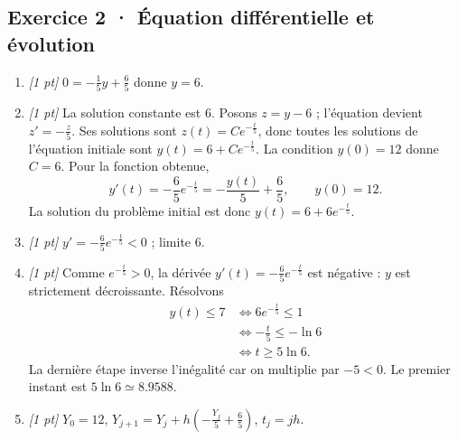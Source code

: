 \subsection*{Exercice 2 · Équation différentielle et évolution}\begin{enumerate}

\item \textit{[1 pt]} $0=-\frac{1}{5}y+\frac{6}{5}$ donne $y=6$.

\item \textit{[1 pt]} La solution constante est $6$. Posons $z=y-6$ ; l'équation devient $z'=-\frac{z}{5}$. Ses solutions sont $z(t)=Ce^{-\frac{t}{5}}$, donc toutes les solutions de l'équation initiale sont $y(t)=6+Ce^{-\frac{t}{5}}$.
La condition $y(0)=12$ donne $C=6$. Pour la fonction obtenue,
\[y'(t)=-\frac{6}{5}e^{-\frac{t}{5}}=-\frac{y(t)}{5}+\frac{6}{5},\qquad y(0)=12.\]
La solution du problème initial est donc $y(t)=6+6e^{-\frac{t}{5}}$.

\item \textit{[1 pt]} $y'=-\frac{6}{5}e^{-\frac{t}{5}}<0$ ; limite $6$.

\item \textit{[1 pt]} Comme $e^{-\frac{t}{5}}>0$, la dérivée $y'(t)=-\frac{6}{5}e^{-\frac{t}{5}}$ est négative : $y$ est strictement décroissante. Résolvons
\[\begin{aligned}y(t)\le 7&\Longleftrightarrow 6e^{-\frac{t}{5}}\le1\\&\Longleftrightarrow -\frac{t}{5}\le-\ln 6\\&\Longleftrightarrow t\ge 5\ln 6.\end{aligned}\]
La dernière étape inverse l'inégalité car on multiplie par $-5<0$. Le premier instant est $5\ln 6\simeq\num{8,9588}$.

\item \textit{[1 pt]} $Y_0=12$, $Y_{j+1}=Y_j+h(-\frac{Y_j}{5}+\frac{6}{5})$, $t_j=jh$.

\end{enumerate}

